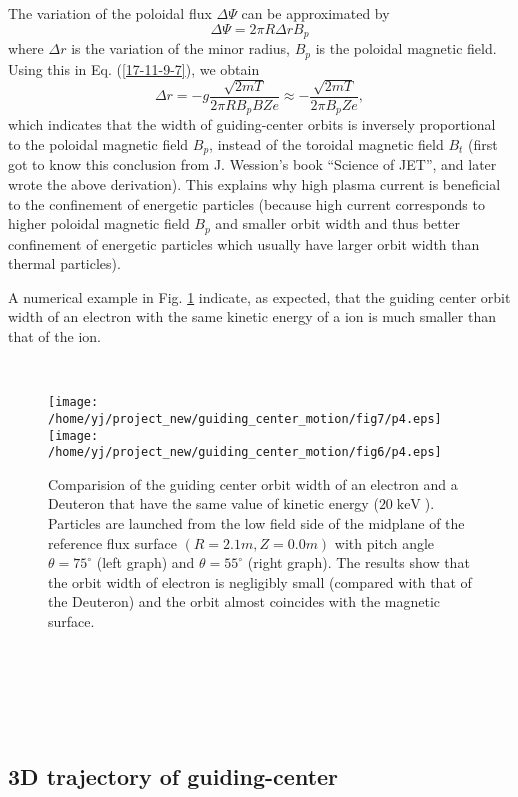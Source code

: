 \documentclass{article}
\newcommand{\tmop}[1]{\ensuremath{\operatorname{#1}}}
\begin{document}
The variation of the poloidal flux $\Delta \Psi$ can be approximated by
\begin{equation}
  \Delta \Psi = 2 \pi R \Delta r B_p
\end{equation}
where $\Delta r$ is the variation of the minor radius, $B_p$ is the poloidal
magnetic field. Using this in Eq. (\ref{17-11-9-7}), we obtain
\begin{equation}
  \Delta r = - g \frac{\sqrt{2 m T} }{2 \pi R B_p B Z e} \approx -
  \frac{\sqrt{2 m T} }{2 \pi B_p Z e},
\end{equation}
which indicates that the width of guiding-center orbits is inversely
proportional to the poloidal magnetic field $B_p$, instead of the toroidal
magnetic field $B_t$ (first got to know this conclusion from J. Wession's book
``Science of JET'', and later wrote the above derivation). This explains why
high plasma current is beneficial to the confinement of energetic particles
(because high current corresponds to higher poloidal magnetic field $B_p$ and
smaller orbit width and thus better confinement of energetic particles which
usually have larger orbit width than thermal particles).

A numerical example in Fig. \ref{6-12-a4} indicate, as expected, that the
guiding center orbit width of an electron with the same kinetic energy of a
ion is much smaller than that of the ion.

\

\begin{figure}[h]
  \texttt{[image: /home/yj/project\_new/guiding\_center\_motion/fig7/p4.eps]}\texttt{[image: /home/yj/project\_new/guiding\_center\_motion/fig6/p4.eps]}
  \caption{\label{6-12-a4}Comparision of the guiding center orbit width of an
  electron and a Deuteron that have the same value of kinetic energy ($20
  \tmop{keV}$). Particles are launched from the low field side of the midplane
  of the reference flux surface $(R = 2.1 m, Z = 0.0 m)$ with pitch angle
  $\theta = 75^{\circ}$ (left graph) and $\theta = 55^{\circ}$ (right graph).
  The results show that the orbit width of electron is negligibly small
  (compared with that of the Deuteron) and the orbit almost coincides with the
  magnetic surface.}
\end{figure}

\

\

\

\subsection{3D trajectory of guiding-center}
\end{document}
